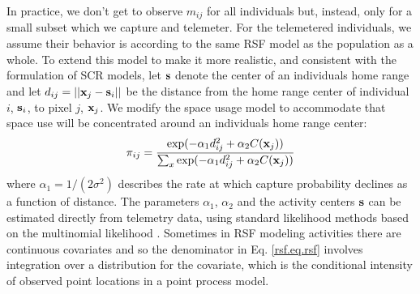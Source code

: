 In practice, we don't get to observe $m_{ij}$ for all individuals but,
instead, only for a small subset which we capture and telemeter.  
For the telemetered individuals, we assume
their behavior is according to the same RSF model as the population as
a whole.  To extend this model to make it more realistic, and
consistent with the formulation of SCR models, let ${\bf s}$ denote
the center of an individuals home range and let $d_{ij} = ||{\bf
  x}_{j} - {\bf s}_{i}||$ be the distance from the home range center
of individual $i$, ${\bf s}_{i}$, to pixel $j$, ${\bf x}_{j}$. We
modify the space usage model to accommodate that space use will be
concentrated around an individuals home range center:
\begin{equation}
 \pi_{ij} = \frac{ \exp( -\alpha_{1} d_{ij}^{2} +\alpha_{2} C({\bf x}_{j}) ) }
{ \sum_{x} \exp(-\alpha_{1} d_{ij}^{2} +\alpha_{2} C({\bf x}_{j}))}
\label{rsf.eq.rsf}
\end{equation}
where $\alpha_1=1/(2\sigma^2)$ describes the rate at which capture
probability declines as a function of distance.  The parameters
$\alpha_{1}$, $\alpha_{2}$ and the activity centers ${\bf s}$ can be
estimated directly from telemetry data, using standard
likelihood methods based on the multinomial likelihood
\citep{johnson_etal:2008}.
Sometimes in RSF modeling activities there are continuous
covariates and so the denominator in Eq. \ref{rsf.eq.rsf} involves 
integration over a distribution for the covariate, which is the
conditional intensity of observed point locations in a point process
model. 


